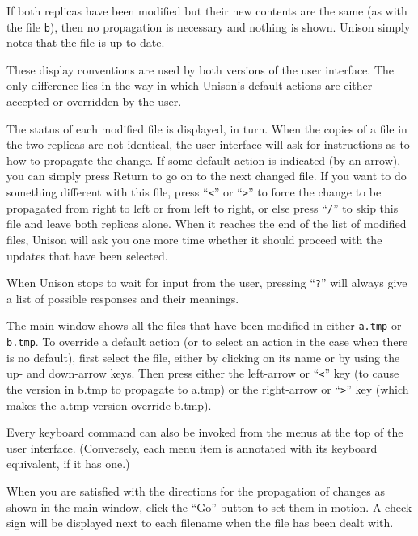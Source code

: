 \documentclass{article}
\begin{document}
If both replicas have been modified but their new contents are the same
(as with the file {\tt b}), then no propagation is necessary and
nothing is shown.  Unison simply notes that the file is up to date.

These display conventions are used by both versions of the user
interface.  The only difference lies in the way in which Unison's
default actions are either accepted or overridden by the user.

\begin{textui}
The status of each modified file is displayed, in turn.
When the copies of a file in the two replicas are not identical, the
user interface will ask for instructions as to how to propagate the
change.  If some default action is indicated (by an arrow), you can
simply press Return to go on to the next changed file.  If you want to
do something different with this file, press ``\verb|<|'' or ``\verb|>|'' to force
the change to be propagated from right to left or from left to right,
or else press ``\verb|/|'' to skip this file and leave both replicas alone.
When it reaches the end of the list of modified files, Unison will ask
you one more time whether it should proceed with the updates that have
been selected.

When Unison stops to wait for input from the user, pressing ``\verb|?|''
will always give a list of possible responses and their meanings.
\end{textui}

\begin{tkui}
The main window shows all the files that have been modified in either
{\tt a.tmp} or {\tt b.tmp}.  To override a default action (or to select
an action in the case when there is no default), first select the file, either
by clicking on its name or by using the up- and down-arrow keys.  Then
press either the left-arrow or ``\verb|<|'' key (to cause the version in b.tmp to
propagate to a.tmp) or the right-arrow or ``\verb|>|'' key (which makes the a.tmp
version override b.tmp).

Every keyboard command can also be invoked from the menus at the top
of the user interface.  (Conversely, each menu item is annotated with
its keyboard equivalent, if it has one.)

When you are satisfied with the directions for the propagation of changes
as shown in the main window, click the ``Go'' button to set them in
motion.  A check sign will be displayed next to each filename
when the file has been dealt with.
\end{tkui}
\end{document}

